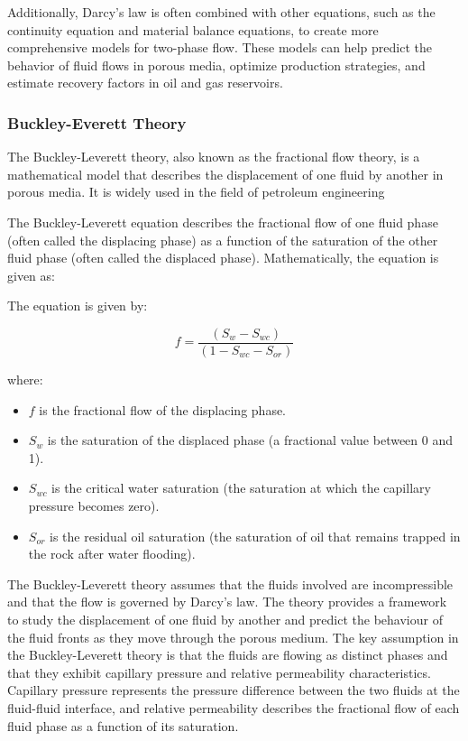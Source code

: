 {		Additionally, Darcy's law is often combined with other equations, such as the continuity equation and material balance equations, to create more comprehensive models for two-phase flow. These models can help predict the behavior of fluid flows in porous media, optimize production strategies, and estimate recovery factors in oil and gas reservoirs.
	
	\subsubsection{Buckley-Everett Theory}
		The Buckley-Leverett theory, also known as the fractional flow theory, is a mathematical model that describes the displacement of one fluid by another in porous media. It is widely used in the field of petroleum engineering 
		
		The Buckley-Leverett equation describes the fractional flow of one fluid phase (often called the displacing phase) as a function of the saturation of the other fluid phase (often called the displaced phase). Mathematically, the equation is given as:
		
		The equation is given by:
	
		\[ f = \frac{{(S_w - S_{wc})}}{{(1 - S_{wc} - S_{or})}} \]
		
		where:
		\begin{itemize}
			\item \( f \) is the fractional flow of the displacing phase.
			
			\item \( S_w \) is the saturation of the displaced phase (a fractional value between 0 and 1).
			
			\item \( S_{wc} \) is the critical water saturation (the saturation at which the capillary pressure becomes zero).
			
			\item \( S_{or} \) is the residual oil saturation (the saturation of oil that remains trapped in the rock after water flooding).
			
		\end{itemize}
	
		The Buckley-Leverett theory assumes that the fluids involved are incompressible and that the flow is governed by Darcy's law. The theory provides a framework to study the displacement of one fluid by another and predict the behaviour of the fluid fronts as they move through the porous medium.
		The key assumption in the Buckley-Leverett theory is that the fluids are flowing as distinct phases and that they exhibit capillary pressure and relative permeability characteristics. Capillary pressure represents the pressure difference between the two fluids at the fluid-fluid interface, and relative permeability describes the fractional flow of each fluid phase as a function of its saturation.

}
